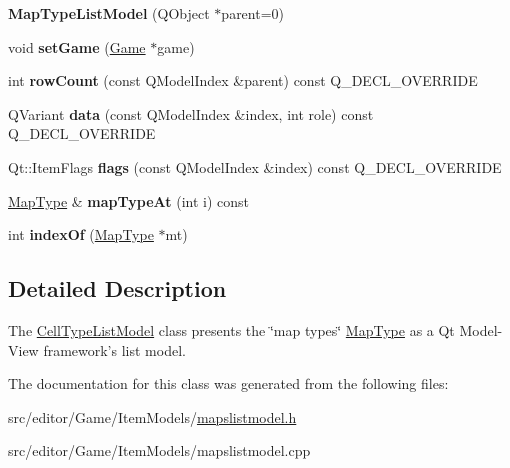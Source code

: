 \begin{DoxyCompactItemize}
\item 
\hypertarget{class_map_type_list_model_a299868f9a19424b60a8b81ef4503d467}{{\bfseries \-Map\-Type\-List\-Model} (\-Q\-Object $\ast$parent=0)}\label{class_map_type_list_model_a299868f9a19424b60a8b81ef4503d467}

\item 
\hypertarget{class_map_type_list_model_a72a4e1608b78e7a4da78badd10e0a473}{void {\bfseries set\-Game} (\hyperlink{class_game}{\-Game} $\ast$game)}\label{class_map_type_list_model_a72a4e1608b78e7a4da78badd10e0a473}

\item 
\hypertarget{class_map_type_list_model_a6c323767a0c422d1eb94e54c7fd5a911}{int {\bfseries row\-Count} (const \-Q\-Model\-Index \&parent) const \-Q\-\_\-\-D\-E\-C\-L\-\_\-\-O\-V\-E\-R\-R\-I\-D\-E}\label{class_map_type_list_model_a6c323767a0c422d1eb94e54c7fd5a911}

\item 
\hypertarget{class_map_type_list_model_afcc842dd9a4f44d416001d28785f02c9}{\-Q\-Variant {\bfseries data} (const \-Q\-Model\-Index \&index, int role) const \-Q\-\_\-\-D\-E\-C\-L\-\_\-\-O\-V\-E\-R\-R\-I\-D\-E}\label{class_map_type_list_model_afcc842dd9a4f44d416001d28785f02c9}

\item 
\hypertarget{class_map_type_list_model_a0d9b0142bdef0b5305b66007baa2e10d}{\-Qt\-::\-Item\-Flags {\bfseries flags} (const \-Q\-Model\-Index \&index) const \-Q\-\_\-\-D\-E\-C\-L\-\_\-\-O\-V\-E\-R\-R\-I\-D\-E}\label{class_map_type_list_model_a0d9b0142bdef0b5305b66007baa2e10d}

\item 
\hypertarget{class_map_type_list_model_a039833392810db276ee6b935333bfcd6}{\hyperlink{class_map_type}{\-Map\-Type} \& {\bfseries map\-Type\-At} (int i) const }\label{class_map_type_list_model_a039833392810db276ee6b935333bfcd6}

\item 
\hypertarget{class_map_type_list_model_a108ca26affc533f74d70ebeaa392a902}{int {\bfseries index\-Of} (\hyperlink{class_map_type}{\-Map\-Type} $\ast$mt)}\label{class_map_type_list_model_a108ca26affc533f74d70ebeaa392a902}

\end{DoxyCompactItemize}


\subsection{\-Detailed \-Description}
\-The \hyperlink{class_cell_type_list_model}{\-Cell\-Type\-List\-Model} class presents the \char`\"{}map types\char`\"{} \hyperlink{class_map_type}{\-Map\-Type} as a \-Qt \-Model-\/\-View framework's list model. 

\-The documentation for this class was generated from the following files\-:\begin{DoxyCompactItemize}
\item 
src/editor/\-Game/\-Item\-Models/\hyperlink{mapslistmodel_8h}{mapslistmodel.\-h}\item 
src/editor/\-Game/\-Item\-Models/mapslistmodel.\-cpp\end{DoxyCompactItemize}

